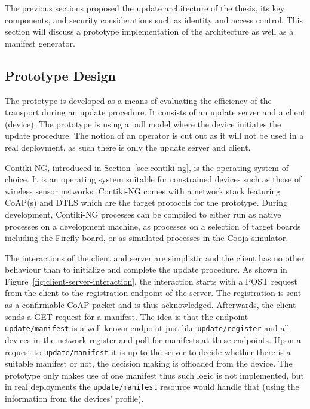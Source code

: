 \documentclass[0-thesis.tex]{subfiles}
\begin{document}
The previous sections proposed the update architecture of the thesis, its key components,
and security considerations such as identity and access control. This section will discuss
a prototype implementation of the architecture as well as a manifest generator. 

\subsection{Prototype Design}
The prototype is developed as a means of evaluating the efficiency of the transport during
an update procedure. It consists of an update server and a client (device). The prototype
is using a pull model where the device initiates the update procedure. The notion of an
operator is cut out as it will not be used in a real deployment, as such there is only the
update server and client.

Contiki-NG, introduced in Section~\ref{sec:contiki-ng}, is the operating system of choice.
It is an operating system suitable for constrained devices such as those of wireless
sensor networks. Contiki-NG comes with a network stack featuring CoAP(s) and DTLS which
are the target protocols for the prototype. During development, Contiki-NG processes can
be compiled to either run as native processes on a development machine, as processes on a
selection of target boards including the Firefly board, or as simulated processes in the
Cooja simulator.

The interactions of the client and server are simplistic and the client has no other
behaviour than to initialize and complete the update procedure. As shown in
Figure~\ref{fig:client-server-interaction}, the interaction starts with a POST request
from the client to the registration endpoint of the server. The registration is sent as a
confirmable CoAP packet and is thus acknowledged. Afterwards, the client sends a GET
request for a manifest. The idea is that the endpoint \texttt{update/manifest} is a well
known endpoint just like \texttt{update/register} and all devices in the network register
and poll for manifests at these endpoints. Upon a request to \texttt{update/manifest} it
is up to the server to decide whether there is a suitable manifest or not, the decision
making is offloaded from the device. The prototype only makes use of one manifest thus
such logic is not implemented, but in real deployments the \texttt{update/manifest}
resource would handle that (using the information from the devices' profile).

\end{document}
